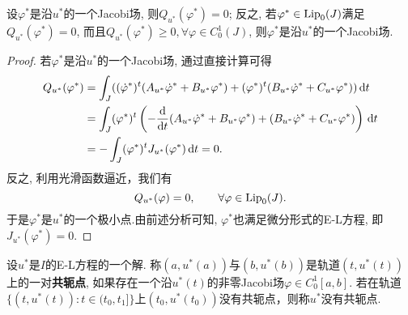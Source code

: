 \begin{proposition}[Jacobi场的刻画]\label{prop1.15}
    设$\varphi^*$是沿$u^*$的一个Jacobi场, 则$Q_{u^*}(\varphi^*) = 0$;
    反之, 若$\varphi^* \in {\rm Lip}_0(J)$满足$Q_{u^*}(\varphi^*) = 0$, 而且$Q_{u^*}(\varphi^*) \geq 0, \forall \varphi \in C_0^1(J)$, 则$\varphi^*$是沿$u^*$的一个Jacobi场.
    \begin{proof}
        若$\varphi^*$是沿$u^*$的一个Jacobi场, 通过直接计算可得
        \begin{align} 
            Q_{u^*}(\varphi^*) &= \int_J((\dot\varphi^*)^t(A_{u^*}\dot{\varphi}^* +B_{u^*}\varphi^*) + (\varphi^*)^t(B_{u^*}\dot\varphi^* + C_{u^*}\varphi^*)) \,{\rm d}t \\ 
            &= \int_J(\varphi^*)^t\left(-\frac{{\rm d}}{{\rm d}t}(A_{u^*}\dot\varphi^* + B_{u^*}\varphi^*) + (B_{u^*}\dot\varphi^* + C_{u^*}\varphi^*)\right) \,{\rm d}t \\  
            &= -\int_J (\varphi^*)^t J_{u^*}(\varphi^*) \,{\rm d}t = 0. 
        \end{align} 
        反之, 利用光滑函数逼近，我们有
        \begin{equation*}
            Q_{u^*}(\varphi) = 0, \qquad \forall \varphi \in {\rm Lip}_0(J). 
        \end{equation*}
        于是$\varphi^*$是$u^*$的一个极小点.由前述分析可知, $\varphi^*$也满足微分形式的E-L方程, 即$J_{u^*}(\varphi^*) = 0$. 
    \end{proof}
\end{proposition}

\begin{definition}
    设$u^*$是$I$的E-L方程的一个解. 称$(a, u^*(a))$与$(b, u^*(b))$是轨道$(t, u^*(t))$上的一对\textbf{共轭点}, 如果存在一个沿$u^*(t)$的非零Jacobi场$\varphi \in C_0^1[a, b]$.
    若在轨道$\{(t, u^*(t))\colon t \in (t_0, t_1]\}$上$(t_0, u^*(t_0))$没有共轭点，则称$u^*$没有共轭点.
\end{definition}

